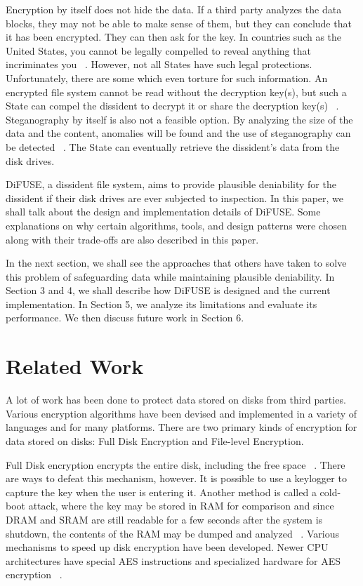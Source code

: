 \documentclass[10pt,twocolumn]{article}
\begin{document}
Encryption by itself does not hide the data. If a third party analyzes the data blocks, they may not be able to make sense of them, but they can conclude that it has been encrypted. They can then ask for the key. In countries such as the United States, you cannot be legally compelled to reveal anything that incriminates you ~\cite{fifth}. However, not all States have such legal protections. Unfortunately, there are some which even torture for such information. An encrypted file system cannot be read without the decryption key(s), but such a State can compel the dissident to decrypt it or share the decryption key(s) ~\cite{gametheory,stegfs}. Steganography by itself is also not a feasible option. By analyzing the size of the data and the content, anomalies will be found and the use of steganography can be detected ~\cite{steg}. The State can eventually retrieve the dissident’s data from the disk drives.

DiFUSE, a dissident file system, aims to provide plausible deniability for the dissident if their disk drives are ever subjected to inspection. In this paper, we shall talk about the design and implementation details of DiFUSE. Some explanations on why certain algorithms, tools, and design patterns were chosen along with their trade-offs are also described in this paper.

In the next section, we shall see the approaches that others have taken to solve this problem of safeguarding data while maintaining plausible deniability. In Section 3 and 4, we shall describe how DiFUSE is designed and the current implementation. In Section 5, we analyze its limitations and evaluate its performance. We then discuss future work in Section 6.

\section{Related Work}

A lot of work has been done to protect data stored on disks from third parties. Various encryption algorithms have been devised and implemented in a variety of languages and for many platforms. There are two primary kinds of encryption for data stored on disks: Full Disk Encryption and File-level Encryption.

Full Disk encryption encrypts the entire disk, including the free space ~\cite{disksym,diskintel,diskwin}. There are ways to defeat this mechanism, however. It is possible to use a keylogger to capture the key when the user is entering it. Another method is called a cold-boot attack, where the key may be stored in RAM for comparison and since DRAM and SRAM are still readable for a few seconds after the system is shutdown, the contents of the RAM may be dumped and analyzed ~\cite{androidenc}. Various mechanisms to speed up disk encryption have been developed. Newer CPU architectures have special AES instructions and specialized hardware for AES encryption ~\cite{intelaes}.
\end{document}
